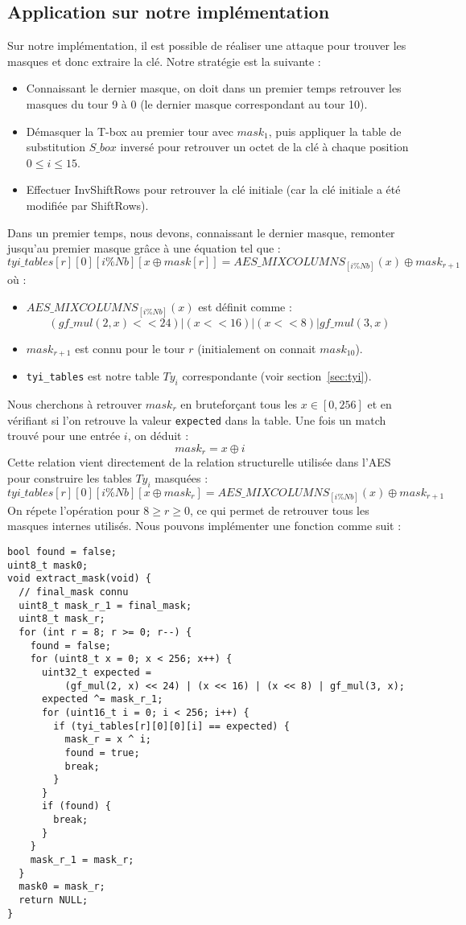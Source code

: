 \documentclass[a4paper, 10pt]{article}
\begin{document}
\subsection{Application sur notre implémentation}
Sur notre implémentation, il est possible de réaliser une attaque pour trouver les masques et donc extraire la 
clé. Notre stratégie est la suivante :
\begin{itemize}
  \item Connaissant le dernier masque, on doit dans un premier temps retrouver les masques du tour 9 à 0 (le 
  dernier masque correspondant au tour 10).
  \item Démasquer la T-box au premier tour avec $mask_{1}$, puis appliquer la table de substitution $S\_box$ inversé pour retrouver 
  un octet de la clé à chaque position $0 \leq i \leq 15$.
  \item Effectuer InvShiftRows pour retrouver la clé initiale (car la clé initiale a été modifiée par ShiftRows).
\end{itemize}
Dans un premier temps, nous devons, connaissant le dernier masque, remonter jusqu'au premier masque grâce à une équation 
tel que :
\[
tyi\_tables[r][0][i \% Nb][x \oplus mask[r]] = AES\_MIXCOLUMNS_{[i \% Nb]}(x) \oplus mask_{r+1}
\]
où :
\begin{itemize}
  \item $AES\_MIXCOLUMNS_{[i \% Nb]}(x)$ est définit comme :
  \[
  (gf\_mul(2, x) << 24) | (x << 16) | (x << 8) | gf\_mul(3, x)
  \]
  \item $mask_{r+1}$ est connu pour le tour $r$ (initialement on connait $mask_{10}$).
  \item \texttt{tyi_tables} est notre table $Ty_{i}$ correspondante (voir section~\ref{sec:tyi}).
\end{itemize}
Nous cherchons à retrouver $mask_{r}$ en bruteforçant tous les $x \in [0, 256]$ et en vérifiant si l'on retrouve 
la valeur \texttt{expected} dans la table. Une fois un match trouvé pour une entrée $i$, on déduit :
\[
mask_{r} = x \oplus i
\]
Cette relation vient directement de la relation structurelle utilisée dans l'AES pour construire les tables $Ty_{i}$ 
masquées :
\[
tyi\_tables[r][0][i \% Nb][x \oplus mask_{r}] = AES\_MIXCOLUMNS_{[i \% Nb]}(x) \oplus mask_{r+1}
\]
On répete l'opération pour $8 \geq r \geq 0$, ce qui permet de retrouver tous les masques internes utilisés. Nous pouvons implémenter une 
fonction comme suit :
\small{
  \begin{verbatim}
bool found = false;
uint8_t mask0;
void extract_mask(void) {
  // final_mask connu
  uint8_t mask_r_1 = final_mask;
  uint8_t mask_r;
  for (int r = 8; r >= 0; r--) {
    found = false;
    for (uint8_t x = 0; x < 256; x++) {
      uint32_t expected =
          (gf_mul(2, x) << 24) | (x << 16) | (x << 8) | gf_mul(3, x);
      expected ^= mask_r_1;
      for (uint16_t i = 0; i < 256; i++) {
        if (tyi_tables[r][0][0][i] == expected) {
          mask_r = x ^ i;
          found = true;
          break;
        }
      }
      if (found) {
        break;
      }
    }
    mask_r_1 = mask_r;
  }
  mask0 = mask_r;
  return NULL;
}
  \end{verbatim}
}
\end{document}
